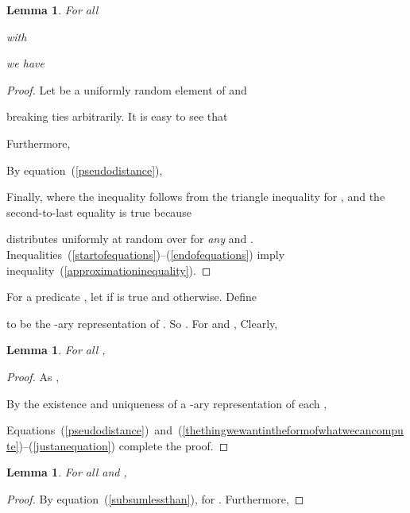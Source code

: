 \documentclass[letterpaper,12pt]{article}
\newtheorem{lemma}[theorem]{Lemma}
\begin{document}
\begin{lemma}
\label{approximationratiolemma}
For all

with

we have

\end{lemma}
\begin{proof}
Let 
be
a
uniformly random
element
of  and

breaking ties arbitrarily.
It is easy to see that

Furthermore,

By equation~(\ref{pseudodistance}),


Finally,
{\small 
}where the
inequality follows from the triangle inequality for , and the
second-to-last equality is true because

distributes uniformly at random over 
for {\em any}  and .
Inequalities~(\ref{startofequations})--(\ref{endofequations})
imply
inequality~(\ref{approximationinequality}).
\end{proof}

For a predicate ,
let  if  is true and  otherwise.
Define

to be
the -ary representation of .
So .
For  and ,
{\small 
}Clearly,



\begin{lemma}\label{theDPresultisthesumofpseudodistanceslemma}
For all ,

\end{lemma}
\begin{proof}
As ,

By the existence and uniqueness of a -ary representation
of each
,

Equations~(\ref{pseudodistance})~and~(\ref{thethingwewantintheformofwhatwecancompute})--(\ref{justanequation})
complete the proof.
\end{proof}


\begin{lemma}
\label{recurrencelemma1}
For all  and ,

\end{lemma}
\begin{proof}
By equation~(\ref{subsumlessthan}),
{\footnotesize 
}for .
Furthermore,

\end{proof}
\end{document}
